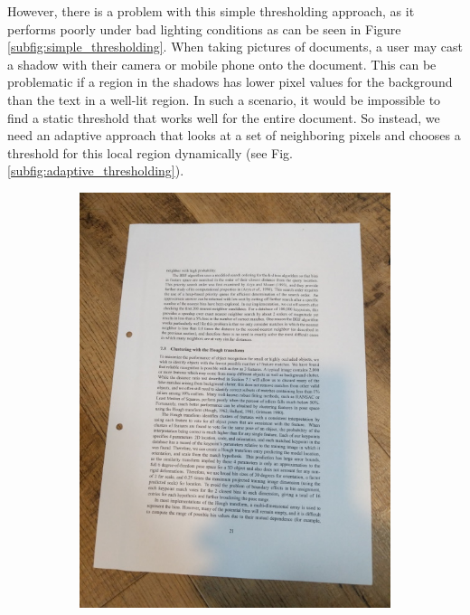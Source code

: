 \documentclass[bibliography=totoc]{scrartcl}
\begin{document}
However, there is a problem with this simple thresholding approach, as it performs poorly under bad lighting conditions as can be seen in Figure \ref{subfig:simple_thresholding}.
When taking pictures of documents, a user may cast a shadow with their camera or mobile phone onto the document.
This can be problematic if a region in the shadows has lower pixel values for the background than the text in a well-lit region.
In such a scenario, it would be impossible to find a static threshold that works well for the entire document.
So instead, we need an adaptive approach that looks at a set of neighboring pixels and chooses a threshold for this local region dynamically (see Fig. \ref{subfig:adaptive_thresholding}). \\

\begin{figure}[hb!]
	\centering
	\begin{subfigure}[t]{0.3\linewidth}
		\includegraphics[width=\linewidth]{imgs/test/bad_lighting.jpg}

\end{subfigure}
\end{figure}
\end{document}
